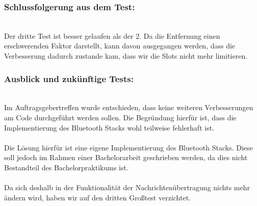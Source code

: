 \subsubsection{Schlussfolgerung aus dem
Test:}\label{schlussfolgerung-aus-dem-test-4}
\\
Der dritte Test ist besser gelaufen als der 2. Da die Entfernung einen
erschwerenden Faktor darstellt, kann davon ausgegangen werden, dass die
Verbesserung dadurch zustande kam, dass wir die Slots nicht mehr
limitieren.
\\
\subsubsection{Ausblick und zukünftige
Tests:}\label{ausblick-und-zukuxfcnftige-tests}
\\
Im Auftragsgebertreffen wurde entschieden, dass keine weiteren
Verbesserungen am Code durchgeführt werden sollen. Die Begründung
hierfür ist, dass die Implementierung des Bluetooth Stacks wohl
teilweise fehlerhaft ist.
\\\\
Die Lösung hierfür ist eine eigene Implementierung des Bluetooth Stacks.
Diese soll jedoch im Rahmen einer Bachelorarbeit geschrieben werden, da
dies nicht Bestandteil des Bachelorpraktikums ist.
\\\\
Da sich deshalb in der Funktionalität der Nachrichtenübertragung nichts
mehr ändern wird, haben wir auf den dritten Großtest verzichtet.

